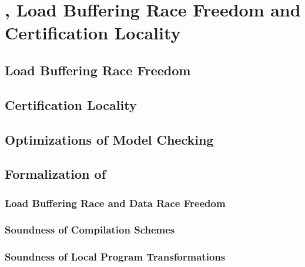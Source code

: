 \chapter{\WkmS, Load Buffering Race Freedom and Certification Locality}
\label{ch:weakestmo2}

\section{Load Buffering Race Freedom}
\label{sec:lbrf}

\section{Certification Locality}
\label{sec:cert-loc}

\section{Optimizations of Model Checking}
\label{sec:mc-opt}


\section{Formalization of \WkmS}
\label{sec:wkmo2}

\subsection{Load Buffering Race and Data Race Freedom}

\subsection{Soundness of Compilation Schemes}

\subsection{Soundness of Local Program Transformations}
